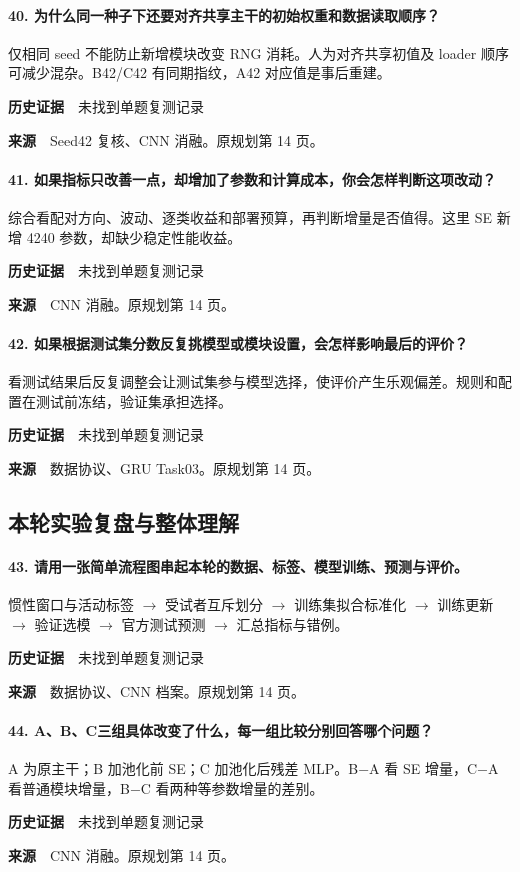 \paragraph{40. 为什么同一种子下还要对齐共享主干的初始权重和数据读取顺序？}
仅相同 seed 不能防止新增模块改变 RNG 消耗。人为对齐共享初值及 loader 顺序可减少混杂。B42/C42 有同期指纹，A42 对应值是事后重建。\par
\textbf{历史证据}　未找到单题复测记录\par
\textbf{来源}　Seed42 复核、CNN 消融。原规划第 14 页。\par
\paragraph{41. 如果指标只改善一点，却增加了参数和计算成本，你会怎样判断这项改动？}
综合看配对方向、波动、逐类收益和部署预算，再判断增量是否值得。这里 SE 新增 4240 参数，却缺少稳定性能收益。\par
\textbf{历史证据}　未找到单题复测记录\par
\textbf{来源}　CNN 消融。原规划第 14 页。\par
\paragraph{42. 如果根据测试集分数反复挑模型或模块设置，会怎样影响最后的评价？}
看测试结果后反复调整会让测试集参与模型选择，使评价产生乐观偏差。规则和配置在测试前冻结，验证集承担选择。\par
\textbf{历史证据}　未找到单题复测记录\par
\textbf{来源}　数据协议、GRU Task03。原规划第 14 页。\par
\clearpage\subsection{本轮实验复盘与整体理解}
\paragraph{43. 请用一张简单流程图串起本轮的数据、标签、模型训练、预测与评价。}
惯性窗口与活动标签 \(\to\) 受试者互斥划分 \(\to\) 训练集拟合标准化 \(\to\) 训练更新 \(\to\) 验证选模 \(\to\) 官方测试预测 \(\to\) 汇总指标与错例。\par
\textbf{历史证据}　未找到单题复测记录\par
\textbf{来源}　数据协议、CNN 档案。原规划第 14 页。\par
\paragraph{44. A、B、C三组具体改变了什么，每一组比较分别回答哪个问题？}
A 为原主干；B 加池化前 SE；C 加池化后残差 MLP。B\(\mathord{-}\)A 看 SE 增量，C\(\mathord{-}\)A 看普通模块增量，B\(\mathord{-}\)C 看两种等参数增量的差别。\par
\textbf{历史证据}　未找到单题复测记录\par
\textbf{来源}　CNN 消融。原规划第 14 页。\par
